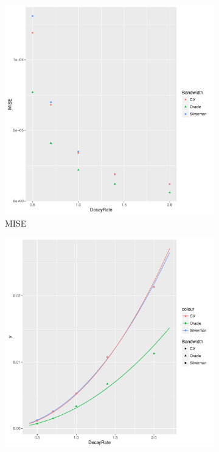 \begin{figure}[htb]
    \centering
    \begin{subfigure}[b]{0.3\textwidth}
    \includegraphics[width=\textwidth]{results/by_cases_decay/MISE-vs-risk-decay}
    \caption{MISE}
    \end{subfigure}
    \begin{subfigure}[b]{0.3\textwidth}
    \includegraphics[width=\textwidth]{results/by_cases_decay/RMISE-vs-risk-decay}

\end{subfigure}
\end{figure}
